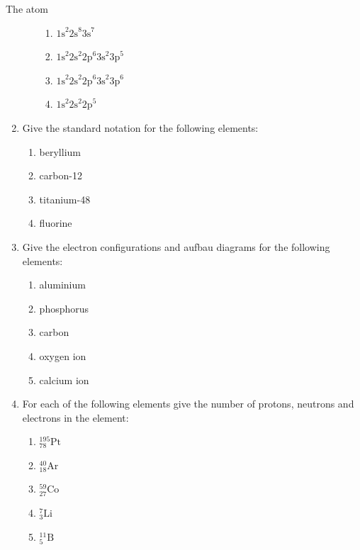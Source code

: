 \begin{eocexercises}{The atom}
\begin{enumerate}[noitemsep, label=\textbf{\arabic*}. ]
\begin{enumerate}[noitemsep, label=\textbf{\alph*}. ]
\label{m38741*id263598}\begin{enumerate}[noitemsep, label=\textbf{\roman*}. ] 
            \label{m38741*uid218}\item  ${1\text{s}}^{2}{2\text{s}}^{8}{3\text{s}}^{7}$\label{m38741*uid219}\item 
${1\text{s}}^{2}{2\text{s}}^{2}{2\text{p}}^{6}{3\text{s}}^{2}{3\text{p}}^{5}$
\label{m38741*uid220}\item 
${1\text{s}}^{2}{2\text{s}}^{2}{2\text{p}}^{6}{3\text{s}}^{2}{3\text{p}}^{6}$\label{m38741*uid221}\item 
${1\text{s}}^{2}{2\text{s}}^{2}{2\text{p}}^{5}$\end{enumerate}
                \end{enumerate}
        \item Give the standard notation for the following elements:
\label{m38741*id8223}\begin{enumerate}[noitemsep, label=\textbf{\alph*}. ] 
            \item beryllium
\item carbon-12
\item titanium-48
\item fluorine
\end{enumerate}
\item Give the electron configurations and aufbau diagrams for the following elements:\label{m38741*id7624}\begin{enumerate}[noitemsep, label=\textbf{\alph*}. ] 
            \item aluminium
\item phosphorus
\item carbon
\item oxygen ion
\item calcium ion
\end{enumerate}
\item For each of the following elements give the number of protons, neutrons and electrons in the element: \label{m38741*id74374}\begin{enumerate}[noitemsep, label=\textbf{\alph*}. ] 
            \item $_{78}^{195}\text{Pt}$
\item $_{18}^{40}\text{Ar}$
\item $_{27}^{59}\text{Co}$
\item $_{3}^{7}\text{Li}$
\item $_{5}^{11}\text{B}$
\end{enumerate}

\end{enumerate}
\end{eocexercises}
